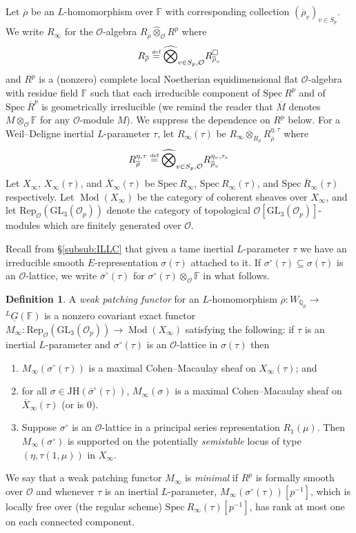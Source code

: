 \documentclass[oneside,a4paper,english, 11pt]{amsart}
\theoremstyle{plain}
\theoremstyle{plain}
\theoremstyle{plain}
\theoremstyle{plain}
\theoremstyle{plain}
\theoremstyle{plain}
\theoremstyle{definition}
\newtheorem{defn}[thm]{Definition}
\theoremstyle{definition}
\theoremstyle{definition}
\theoremstyle{remark}
\numberwithin{equation}{section}
\newcommand{\Q}{\mathbb{Q}}
\newcommand{\F}{\mathbb{F}}
\newcommand{\cO}{\mathcal{O}}
\newcommand{\GL}{\mathrm{GL}}
\newcommand{\Spec}{\mathrm{Spec}\ }
\newcommand{\un}[1]{\underline{#1}}
\newcommand{\Rep}{\mathrm{Rep}}
\newcommand{\JH}{\mathrm{JH}}
\newcommand{\rhobar}{\overline{\rho}}
\newcommand{\defeq}{\stackrel{\textrm{\tiny{def}}}{=}}
\newcommand{\ovl}[1]{\overline{#1}}
\DeclareMathOperator{\Mod}{Mod}
\DeclareMathOperator{\Coh}{Mod}
\newcommand{\ra}{\rightarrow}
\begin{document}
Let $\rhobar$ be an $L$-homomorphism over $\F$ with corresponding collection $(\rhobar_v)_{v \in S_p}$.
We write $R_\infty$ for the $\cO$-algebra $R_{\rhobar} \widehat{\otimes}_{\cO} R^p$ where
\[
R_{\rhobar} \defeq \widehat{\bigotimes}_{v\in S_p,\cO} R_{\rhobar_v}^\square
\]
%
and $R^p$ is a (nonzero) complete local Noetherian equidimensional flat $\cO$-algebra with residue field $\F$ such that each irreducible component of $\Spec R^p$ and of $\Spec \overline{R}^p$ is geometrically irreducible (we remind the reader that $\ovl{M}$ denotes $M\otimes_\cO\F$ for any $\cO$-module $M$). 
We suppress the dependence on $R^p$ below.
%
For a Weil--Deligne inertial $L$-parameter $\tau$, let $R_\infty(\tau)$
%
be $R_\infty \otimes_{R_{\rhobar}} R_{\rhobar}^{\eta,\tau}$ 
%
where
\[
R_{\rhobar}^{\eta,\tau} \defeq \widehat{\bigotimes}_{v\in S_p,\cO} R_{\rhobar_{v}}^{\eta_{v},\tau_{v}}%
\]
Let $X_\infty$, $X_\infty(\tau)$, and $\ovl{X}_\infty(\tau)$
%
be $\Spec R_\infty$, $\Spec R_\infty(\tau)$, and $\Spec \ovl{R}_\infty(\tau)$ 
%
respectively. 
Let $\Mod(X_\infty)$ be the category of coherent sheaves over $X_\infty$, and let $\Rep_{\cO}(\GL_3(\cO_p))$ denote the category of topological $\cO[\GL_3(\cO_p)]$-modules which are finitely generated over $\cO$. 
%
%


Recall from \S \ref{subsub:ILLC} that given a tame inertial $L$-parameter $\tau$ we have an irreducible smooth $E$-representation $\sigma(\tau)$ attached to it. 
If $\sigma^\circ(\tau)\subseteq \sigma(\tau)$ is an $\cO$-lattice, we write $\ovl{\sigma}^\circ(\tau)$ for $\sigma^\circ(\tau)\otimes_\cO\F$ in what follows.

\begin{defn}\label{minimalpatching}
A \emph{weak patching functor} for an $L$-homomorphism $\rhobar: W_{\Q_p} \ra$ $^L \un{G}(\F)$ is a nonzero covariant exact functor $M_\infty:\Rep_{\cO}(\GL_3(\cO_p))\ra \Coh(X_{\infty})$ satisfying the following: if $\tau$ is an inertial $L$-parameter and $\sigma^\circ(\tau)$ is an $\cO$-lattice in $\sigma(\tau)$ then
\begin{enumerate}
\item 
\label{it:minimalpatching:1}
$M_\infty(\sigma^\circ(\tau))$ is a maximal Cohen--Macaulay sheaf on $X_\infty(\tau)$; and
\item 
\label{it:minimalpatching:2}
for all $\sigma \in \JH(\ovl{\sigma}^\circ(\tau))$, $M_\infty(\sigma)$ is a maximal Cohen--Macaulay sheaf on $\ovl{X}_\infty(\tau)$ (or is $0$).
\item
\label{it:minimalpatching:3}
Suppose $\sigma^\circ$ is an $\cO$-lattice in a principal series representation $R_1(\mu)$.
Then $M_\infty(\sigma^\circ)$ is supported on the potentially \emph{semistable} locus of type $(\eta, \tau(1,\mu))$ in $X_\infty$.
\end{enumerate}
We say that a weak patching functor $M_\infty$ is \emph{minimal} if $R^p$ is formally smooth over $\cO$ and whenever $\tau$ is an inertial $L$-parameter, $M_\infty(\sigma^\circ(\tau))[p^{-1}]$, which is locally free over (the regular scheme) $\Spec R_\infty(\tau)[p^{-1}]$, has rank at most one on each connected component.
\end{defn}
\end{document}
